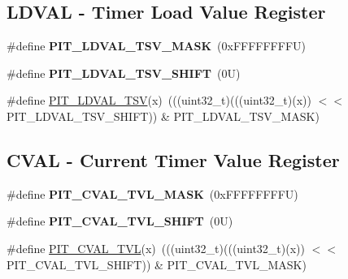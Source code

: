 \subsection*{L\+D\+V\+AL -\/ Timer Load Value Register}
\begin{DoxyCompactItemize}
\item 
\mbox{\label{group___p_i_t___register___masks_gab7929b3b8a0c170a50f57d97face5365}} 
\#define {\bfseries P\+I\+T\+\_\+\+L\+D\+V\+A\+L\+\_\+\+T\+S\+V\+\_\+\+M\+A\+SK}~(0x\+F\+F\+F\+F\+F\+F\+F\+F\+U)
\item 
\mbox{\label{group___p_i_t___register___masks_ga463855d2b42de901bad9bea868f4f48b}} 
\#define {\bfseries P\+I\+T\+\_\+\+L\+D\+V\+A\+L\+\_\+\+T\+S\+V\+\_\+\+S\+H\+I\+FT}~(0\+U)
\item 
\#define \mbox{\hyperlink{group___p_i_t___register___masks_ga1aa1b498b2c8f1a14d095370a7ddf9a6}{P\+I\+T\+\_\+\+L\+D\+V\+A\+L\+\_\+\+T\+SV}}(x)~(((uint32\+\_\+t)(((uint32\+\_\+t)(x)) $<$$<$ P\+I\+T\+\_\+\+L\+D\+V\+A\+L\+\_\+\+T\+S\+V\+\_\+\+S\+H\+I\+FT)) \& P\+I\+T\+\_\+\+L\+D\+V\+A\+L\+\_\+\+T\+S\+V\+\_\+\+M\+A\+SK)
\end{DoxyCompactItemize}
\subsection*{C\+V\+AL -\/ Current Timer Value Register}
\begin{DoxyCompactItemize}
\item 
\mbox{\label{group___p_i_t___register___masks_ga2810b877338372cb9b9d944b206c08d3}} 
\#define {\bfseries P\+I\+T\+\_\+\+C\+V\+A\+L\+\_\+\+T\+V\+L\+\_\+\+M\+A\+SK}~(0x\+F\+F\+F\+F\+F\+F\+F\+F\+U)
\item 
\mbox{\label{group___p_i_t___register___masks_ga28753a1a45034ccd34e052faa3e02ff0}} 
\#define {\bfseries P\+I\+T\+\_\+\+C\+V\+A\+L\+\_\+\+T\+V\+L\+\_\+\+S\+H\+I\+FT}~(0\+U)
\item 
\#define \mbox{\hyperlink{group___p_i_t___register___masks_ga00291ae8d045c0b0f199d8950c7e453a}{P\+I\+T\+\_\+\+C\+V\+A\+L\+\_\+\+T\+VL}}(x)~(((uint32\+\_\+t)(((uint32\+\_\+t)(x)) $<$$<$ P\+I\+T\+\_\+\+C\+V\+A\+L\+\_\+\+T\+V\+L\+\_\+\+S\+H\+I\+FT)) \& P\+I\+T\+\_\+\+C\+V\+A\+L\+\_\+\+T\+V\+L\+\_\+\+M\+A\+SK)
\end{DoxyCompactItemize}
